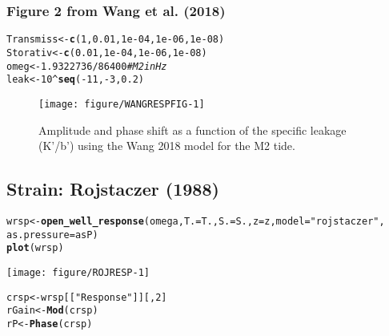 \documentclass[12pt]{article}\usepackage[]{graphicx}\usepackage[]{xcolor}
\makeatletter
\def\maxwidth{ %
  \ifdim\Gin@nat@width>\linewidth
    \linewidth
  \else
    \Gin@nat@width
  \fi
}
\newcommand{\hlnum}[1]{\textcolor[rgb]{0.686,0.059,0.569}{#1}}%
\newcommand{\hlsng}[1]{\textcolor[rgb]{0.192,0.494,0.8}{#1}}%
\newcommand{\hlcom}[1]{\textcolor[rgb]{0.678,0.584,0.686}{\textit{#1}}}%
\newcommand{\hlopt}[1]{\textcolor[rgb]{0,0,0}{#1}}%
\newcommand{\hldef}[1]{\textcolor[rgb]{0.345,0.345,0.345}{#1}}%
\newcommand{\hlkwb}[1]{\textcolor[rgb]{0.69,0.353,0.396}{#1}}%
\newcommand{\hlkwc}[1]{\textcolor[rgb]{0.333,0.667,0.333}{#1}}%
\newcommand{\hlkwd}[1]{\textcolor[rgb]{0.737,0.353,0.396}{\textbf{#1}}}%
\newenvironment{kframe}{%
 \def\at@end@of@kframe{}%
 \ifinner\ifhmode%
  \def\at@end@of@kframe{\end{minipage}}%
  \begin{minipage}{\columnwidth}%
 \fi\fi%
 \def\FrameCommand##1{\hskip\@totalleftmargin \hskip-\fboxsep
 \colorbox{shadecolor}{##1}\hskip-\fboxsep
     \hskip-\linewidth \hskip-\@totalleftmargin \hskip\columnwidth}%
 \MakeFramed {\advance\hsize-\width
   \@totalleftmargin\z@ \linewidth\hsize
   \@setminipage}}%
 {\par\unskip\endMakeFramed%
 \at@end@of@kframe}
\newenvironment{knitrout}{}{} %
\makeatother
\begin{document}
\clearpage
\subsubsection{Figure 2 from Wang et al. (2018)}

\begin{knitrout}\small
{}\color{fgcolor}\begin{kframe}
\begin{alltt}
\hldef{Transmiss} \hlkwb{<-} \hlkwd{c}\hldef{(}\hlnum{1}\hldef{,} \hlnum{0.01}\hldef{,} \hlnum{1e-04}\hldef{,} \hlnum{1e-06}\hldef{,} \hlnum{1e-08}\hldef{)}
\hldef{Storativ} \hlkwb{<-} \hlkwd{c}\hldef{(}\hlnum{0.01}\hldef{,} \hlnum{1e-04}\hldef{,} \hlnum{1e-06}\hldef{,} \hlnum{1e-08}\hldef{)}
\hldef{omeg} \hlkwb{<-} \hlnum{1.9322736}\hlopt{/}\hlnum{86400}  \hlcom{# M2 in Hz}
\hldef{leak} \hlkwb{<-} \hlnum{10}\hlopt{^}\hlkwd{seq}\hldef{(}\hlopt{-}\hlnum{11}\hldef{,} \hlopt{-}\hlnum{3}\hldef{,} \hlnum{0.2}\hldef{)}
\end{alltt}
\end{kframe}
\end{knitrout}

\begin{figure}[htb!]
\begin{center}
\begin{knitrout}\small
{}\color{fgcolor}
\texttt{[image: figure/WANGRESPFIG-1]} 
\end{knitrout}
\caption{Amplitude and phase shift as a function of the specific leakage (K'/b') using the Wang 2018 model for the M2 tide.}
\label{fig:owrsp-wang}
\end{center}
\end{figure}



\clearpage
\subsection{Strain: Rojstaczer (1988)}

\begin{knitrout}\small
{}\color{fgcolor}\begin{kframe}
\begin{alltt}
\hldef{wrsp} \hlkwb{<-} \hlkwd{open_well_response}\hldef{(omega,} \hlkwc{T.} \hldef{= T.,} \hlkwc{S.} \hldef{= S.,} \hlkwc{z} \hldef{= z,} \hlkwc{model} \hldef{=} \hlsng{"rojstaczer"}\hldef{,}
    \hlkwc{as.pressure} \hldef{= asP)}
\hlkwd{plot}\hldef{(wrsp)}
\end{alltt}
\end{kframe}
\texttt{[image: figure/ROJRESP-1]} 
\begin{kframe}\begin{alltt}
\hldef{crsp} \hlkwb{<-} \hldef{wrsp[[}\hlsng{"Response"}\hldef{]][,} \hlnum{2}\hldef{]}
\hldef{rGain} \hlkwb{<-} \hlkwd{Mod}\hldef{(crsp)}
\hldef{rP} \hlkwb{<-} \hlkwd{Phase}\hldef{(crsp)}
\end{alltt}
\end{kframe}
\end{knitrout}
\end{document}
